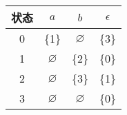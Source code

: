 \documentclass[12pt,a4paper]{article}
\newenvironment{problems}{\begin{list}{}{\renewcommand{\makelabel}[1]{\textbf{##1}\hfil}}}{\end{list}}
\newenvironment{steps}{\begin{list}{}{\renewcommand{\makelabel}[1]{##1)\hfil}}}{\end{list}}
\begin{document}
\begin{problems}
\begin{steps}
         

         \begin{tabular}{c|ccc}
            状态 & $a$ & $b$ & $\epsilon$\\
             \hline
            0 & \{1\} & $\varnothing$ & \{3\}\\
            1 & $\varnothing$ & \{2\} & \{0\} \\
            2 & $\varnothing$ & \{3\} & \{1\} \\
            3 & $\varnothing$ & $\varnothing$ & \{0\}
         \end{tabular}
    \end{steps} 
\end{problems}
\end{document}
